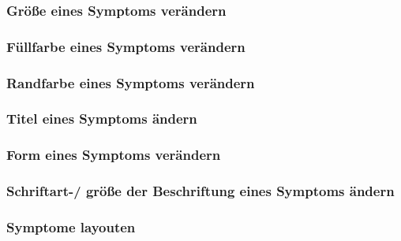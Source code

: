 \documentclass[enabledeprecatedfontcommands,fontsize=11pt,paper=a4,twoside]{scrartcl}
\begin{document}
		\subsubsection{Größe eines Symptoms verändern}
		\subsubsection{Füllfarbe eines Symptoms verändern}
		\subsubsection{Randfarbe eines Symptoms verändern}
		\subsubsection{Titel eines Symptoms ändern}
		\subsubsection{Form eines Symptoms verändern}
		\subsubsection{Schriftart-/ größe der Beschriftung eines Symptoms ändern}
		\subsubsection{Symptome layouten}
		
		\newpage	
\end{document}
